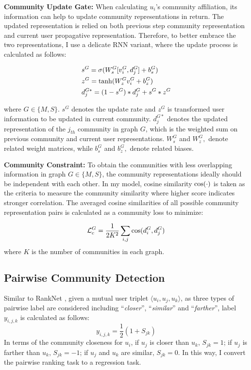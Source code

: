 \textbf{Community Update Gate: } \label{sc:cug} When calculating $u_i$'s community affiliation, its information can help to update community representations in return. The updated representation is relied on both previous step community representation and current user propagative representation. Therefore, to better embrace the two representations, I use a delicate RNN variant, where the update process is calculated as follows:

\begin{equation}\label{eq:up}
\begin{aligned}
&  s^G = \sigma(W_s^G[v_i^{G},d_j^{G}] + b_s^G) \\
& z^G = {\rm tanh}(W_z^Gv_i^G+b_z^G)\\
& d_j^{G*} = (1-s^G)*d_j^{G} + s^G*z^G
\end{aligned}
\end{equation}

where $G \in \{M,S\}$. $s^G$ denotes the update rate and $z^G$ is transformed user information to be updated in current community.  $d_j^{G*}$ denotes the updated representation of the $j_{th}$ community in graph $G$, which is the weighted sum on previous community and current user representations. $W_s^G$ and $W_z^G,$ denote related weight matrices, while $b_s^G$ and $b_z^G,$ denote related biases. 

\textbf{Community Constraint: }
To obtain the communities with less overlapping information in graph $G \in \{M,S\}$, the community representations ideally should be independent with each other. In my model, cosine similarity ${\rm cos}(\cdot)$ is taken as the criteria to measure the community similarity where higher score indicates stronger correlation. The averaged cosine similarities of all possible community representation pairs is calculated as a community loss to minimize:

\begin{equation}\label{eq:cc}
\mathcal{L}_{c}^{G} = \frac{1}{2K^2}\sum_{i,j}{\rm cos}(d_i^{G},d_j^{G})
\end{equation}
where $K$ is the number of communities in each graph.

\subsection{Pairwise Community Detection}\label{sc:pcd}

Similar to RankNet \cite{burges2010ranknet}, given a mutual user triplet  $\langle u_i,u_j,u_k \rangle$, as three types of pairwise label are considered including ``\textit{closer}'', ``\textit{similar}'' and ``\textit{farther}'', label $y_{i,j,k}$  is calculated as follows:
\begin{equation}\label{eq:y}
y_{i,j,k} = \frac{1}{2}(1+S_{jk})
\end{equation}
In terms of the community closeness for $u_i$, if $u_j$ is closer than $u_k$, $S_{jk} = 1$; if $u_j$ is farther than $u_k$, $S_{jk} = -1$; if $u_j$ and $u_k$ are similar, $S_{jk} = 0$. In this way, I convert the pairwise ranking task to a regression task. 

